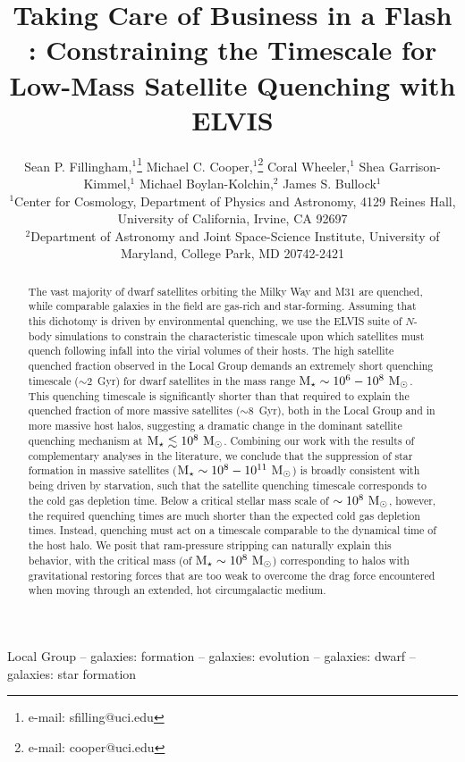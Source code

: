 \documentclass[usenatbib]{mn2e}
\title[TCB\Lightning: The Mass Dependence of Satellite Quenching]
{Taking Care of Business in a Flash \Lightning:  
Constraining the Timescale for Low-Mass Satellite Quenching with ELVIS
}
\author[Fillingham et al.]
{Sean P. Fillingham,$^1$\thanks{$\!\!$e-mail: sfilling@uci.edu}
Michael C. Cooper,$^1$\thanks{$\!\!$e-mail: cooper@uci.edu}
Coral Wheeler,$^1$ 
\newauthor Shea Garrison-Kimmel,$^1$ 
Michael Boylan-Kolchin,$^2$
James S. Bullock$^1$ \\
$\!\!^1$Center for Cosmology, Department of Physics and Astronomy, 
  4129 Reines Hall, University of California, Irvine, CA 92697 \\ %
$\!\!^2$Department of Astronomy and Joint Space-Science Institute,
University of Maryland, 
College Park, MD 20742-2421}
\newcommand{\mstar}{{\rm M}_{\star}}
\newcommand{\msun}{{\rm M}_{\odot}}
\begin{document}
\pagerange{\pageref{firstpage}--\pageref{lastpage}} 

\maketitle

\label{firstpage}
\begin{abstract}
  The vast majority of dwarf satellites orbiting the Milky Way and M31
  are quenched, while comparable galaxies in the field are gas-rich
  and star-forming. Assuming that this dichotomy is driven by
  environmental quenching, we use the ELVIS suite of $N$-body
  simulations to constrain the characteristic timescale upon which
  satellites must quench following infall into the virial volumes of
  their hosts. The high satellite quenched fraction observed in the
  Local Group demands an extremely short quenching timescale
  ($\sim2$~Gyr) for dwarf satellites in the mass range $\mstar \sim
  10^{6}-10^{8}~\msun$. This quenching timescale is significantly
  shorter than that required to explain the quenched fraction of more
  massive satellites ($\sim 8$~Gyr), both in the Local Group and in
  more massive host halos, suggesting a dramatic change in the
  dominant satellite quenching mechanism at $\mstar \lesssim
  10^{8}~\msun$. Combining our work with the results of complementary
  analyses in the literature, we conclude that the suppression of star
  formation in massive satellites ($\mstar \sim 10^{8}-10^{11}~\msun$)
  is broadly consistent with being driven by starvation, such that the
  satellite quenching timescale corresponds to the cold gas depletion
  time. Below a critical stellar mass scale of $\sim 10^{8}~\msun$,
  however, the required quenching times are much shorter than the
  expected cold gas depletion times. Instead, quenching must act on a
  timescale comparable to the dynamical time of the host halo.  We
  posit that ram-pressure stripping can naturally explain this
  behavior, with the critical mass (of $\mstar \sim 10^{8}~\msun$)
  corresponding to halos with gravitational restoring forces that are
  too weak to overcome the drag force encountered when moving through
  an extended, hot circumgalactic medium.
\end{abstract}


\begin{keywords}
  Local Group -- galaxies: formation -- galaxies: evolution --
  galaxies: dwarf -- galaxies: star formation
\end{keywords}
\end{document}
